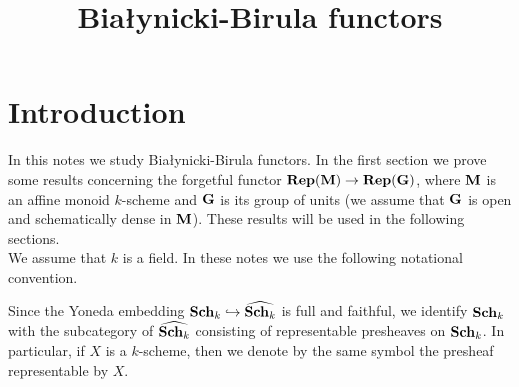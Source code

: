 



\title{Bia{\l}ynicki-Birula functors}
\date{}
\maketitle

\section{Introduction}
\noindent
In this notes we study Bia{\l}ynicki-Birula functors. In the first section we prove some results concerning the forgetful functor $\mathbf{Rep}(\mathbf{M})\rightarrow \mathbf{Rep}(\mathbf{G})$, where $\mathbf{M}$ is an affine monoid $k$-scheme and $\mathbf{G}$ is its group of units (we assume that $\mathbf{G}$ is open and schematically dense in $\mathbf{M}$). These results will be used in the following sections.\\
We assume that $k$ is a field. In these notes we use the following notational convention.

\begin{remark}\label{remark:notational_convention_identyfication_of_schemes_and_representable_preheaves}
Since the Yoneda embedding $\mathbf{Sch}_k\hookrightarrow \widehat{\mathbf{Sch}_k}$ is full and faithful, we identify $\mathbf{Sch}_k$ with the subcategory of $\widehat{\mathbf{Sch}_k}$ consisting of representable presheaves on $\mathbf{Sch}_k$. In particular, if $X$ is a $k$-scheme, then we denote by the same symbol the presheaf representable by $X$.
\end{remark}

